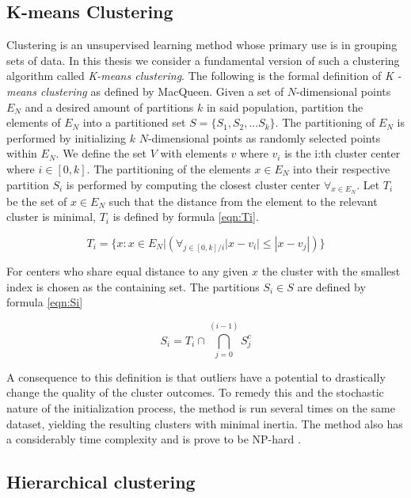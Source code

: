 \subsection{K-means Clustering}

Clustering is an unsupervised learning method whose primary use is in grouping sets of data. In this thesis we consider a fundamental version of such a clustering algorithm called \textit{K-means clustering}. The following is the formal definition of \textit{K - means clustering} as defined by MacQueen\cite{macqueen}. Given a set of $N$-dimensional points $E_N$ and a desired amount of partitions $k$ in said population, partition the elements of $E_N$ into a partitioned set $S = \{S_1, S_2, ... S_k\}$. The partitioning of $E_N$ is performed by initializing $k$  $N$-dimensional points as randomly selected points within $E_N$. We define the set $V$ with elements $v$ where $v_i$ is the i:th cluster center where $i \in [0, k]$. The partitioning of the elements $x \in E_N$ into their respective partition $S_i$ is performed by computing the closest cluster center $\forall_{x \in E_N}$. Let $T_i$ be the set of $x \in E_N$ such that the distance from the element to the relevant cluster is minimal, $T_i$ is defined by formula \ref{eqn:Ti}.

\begin{equation}
\label{eqn:Ti}
T_i = \{x : x \in E_N | (\forall_{j \in [0, k]/i } |x - v_i| \leq |x - v_j|)\} 
\end{equation}

For centers who share equal distance to any given $x$ the cluster with the smallest index is chosen as the containing set. The partitions $S_i \in S$ are defined by formula \ref{eqn:Si}

\begin{equation}
\label{eqn:Si}
S_i = T_i \cap \bigcap_{j=0}^{(i-1)} S_j^c
\end{equation}

A consequence to this definition is that outliers have a potential to drastically change the quality of the cluster outcomes. To remedy this and the stochastic nature of the initialization process, the method is run several times on the same dataset, yielding the resulting clusters with minimal inertia. The method also has a considerably time complexity and is prove to be NP-hard \cite{mahajan2009planar}.


\subsection{Hierarchical clustering}

